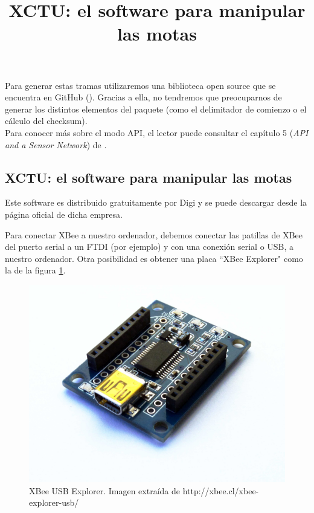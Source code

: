 Para generar estas tramas utilizaremos una biblioteca open source que se encuentra en GitHub (\cite{libraryArduinoXBee}).
Gracias a ella, no tendremos que preocuparnos de generar los distintos elementos del paquete
(como el delimitador de comienzo o el cálculo del checksum).\\

Para conocer más sobre el modo API, el lector puede consultar el capítulo 5 (\textit{API and a Sensor Network}) de \cite{faludi}.\\

\subsection{XCTU: el software para manipular las motas}
\title{XCTU: el software para manipular las motas}
Este software es distribuido gratuitamente por Digi \cite{licenciaXCTU} y se puede descargar desde la página oficial
de dicha empresa.

Para conectar XBee a nuestro ordenador, debemos conectar las patillas de XBee del puerto serial a un
FTDI (por ejemplo) y con una conexión serial o USB, a nuestro ordenador. Otra posibilidad es obtener
una placa ``XBee Explorer" como la de la figura \ref{fig:xbeeexplorer}.


\begin{figure}[htb]
\centering
\includegraphics[width=1\textwidth]{./imagenes/xbeeexplorer}
\caption{XBee USB Explorer. Imagen extraída de \scriptsize{http://xbee.cl/xbee-explorer-usb/}} \label{fig:xbeeexplorer}
\end{figure}


